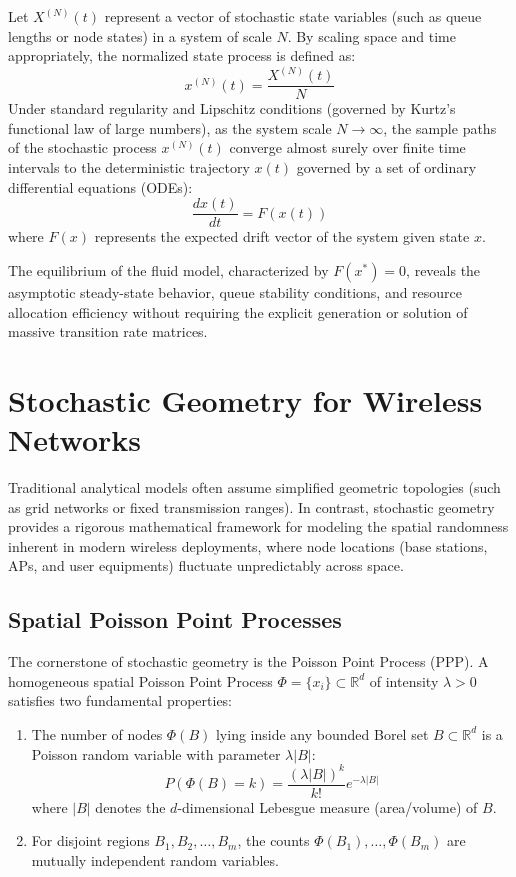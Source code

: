 Let $X^{(N)}(t)$ represent a vector of stochastic state variables (such as queue lengths or node states) in a system of scale $N$. By scaling space and time appropriately, the normalized state process is defined as:
\begin{equation}
    x^{(N)}(t) = \frac{X^{(N)}(t)}{N}
\end{equation}
Under standard regularity and Lipschitz conditions (governed by Kurtz's functional law of large numbers), as the system scale $N \to \infty$, the sample paths of the stochastic process $x^{(N)}(t)$ converge almost surely over finite time intervals to the deterministic trajectory $x(t)$ governed by a set of ordinary differential equations (ODEs):
\begin{equation}
    \frac{d x(t)}{dt} = F(x(t))
\end{equation}
where $F(x)$ represents the expected drift vector of the system given state $x$. 

The equilibrium of the fluid model, characterized by $F(x^*) = 0$, reveals the asymptotic steady-state behavior, queue stability conditions, and resource allocation efficiency without requiring the explicit generation or solution of massive transition rate matrices.

\section{Stochastic Geometry for Wireless Networks}
Traditional analytical models often assume simplified geometric topologies (such as grid networks or fixed transmission ranges). In contrast, stochastic geometry provides a rigorous mathematical framework for modeling the spatial randomness inherent in modern wireless deployments, where node locations (base stations, APs, and user equipments) fluctuate unpredictably across space.

\subsection{Spatial Poisson Point Processes}
The cornerstone of stochastic geometry is the Poisson Point Process (PPP). A homogeneous spatial Poisson Point Process $\Phi = \{x_i\} \subset \mathbb{R}^d$ of intensity $\lambda > 0$ satisfies two fundamental properties:
\begin{enumerate}
    \item The number of nodes $\Phi(B)$ lying inside any bounded Borel set $B \subset \mathbb{R}^d$ is a Poisson random variable with parameter $\lambda |B|$:
    \begin{equation}
        P(\Phi(B) = k) = \frac{(\lambda |B|)^k}{k!} e^{-\lambda |B|}
    \end{equation}
    where $|B|$ denotes the $d$-dimensional Lebesgue measure (area/volume) of $B$.
    \item For disjoint regions $B_1, B_2, \dots, B_m$, the counts $\Phi(B_1), \dots, \Phi(B_m)$ are mutually independent random variables.
\end{enumerate}

